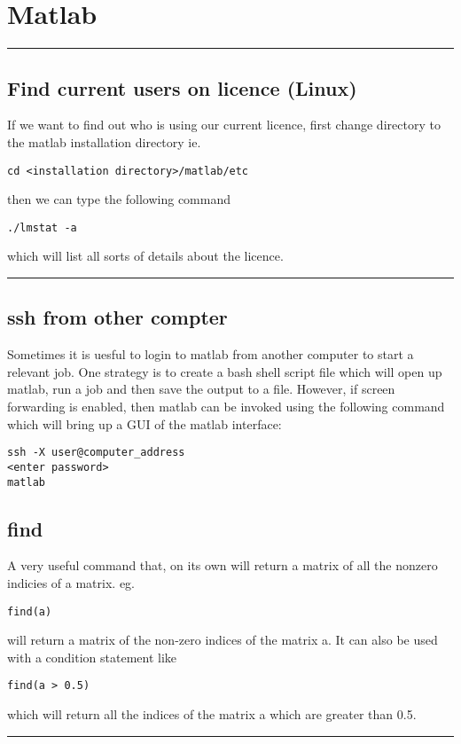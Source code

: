 \documentclass[a4paper, 10pt]{article}
\newcommand{\mytoprule}{\hrule\vspace{4mm}}
\newcommand{\mybotrule}{\vspace{4mm}\hrule}
\begin{document}
\vspace{10mm}
\section*{Matlab}

\mytoprule
\subsection*{Find current users on licence (Linux)}
If we want to find out who is using our current licence, first change directory to the matlab installation directory ie.
\begin{Verbatim}[commandchars=\\\{\}]
cd <installation directory>/matlab/etc
\end{Verbatim}
then we can type the following command 
\begin{Verbatim}[commandchars=\\\{\}]
./lmstat -a
\end{Verbatim}
which will list all sorts of details about the licence. 
\mybotrule

\subsection*{ssh from other compter}
\label{sec:ssh-from-other}

Sometimes it is uesful to login to matlab from another computer to
start a relevant job. One strategy is to create a bash shell script
file which will open up matlab, run a job and then save the output to
a file. However, if screen forwarding is enabled, then matlab can be
invoked using the following command which will bring up a GUI of the
matlab interface:
\begin{verbatim}
ssh -X user@computer_address
<enter password>
matlab
\end{verbatim}


\subsection*{find}
A very useful command that, on its own will return a matrix of all the nonzero indicies of a matrix. eg. 
\begin{Verbatim}[commandchars=\\\{\}]
find(a)
\end{Verbatim}
will return a matrix of the non-zero indices of the matrix a. It can also be used with a condition statement like
\begin{Verbatim}[commandchars=\\\{\}]
find(a > 0.5)
\end{Verbatim}
which will return all the indices of the matrix a which are greater than 0.5.
\mybotrule
\end{document}
